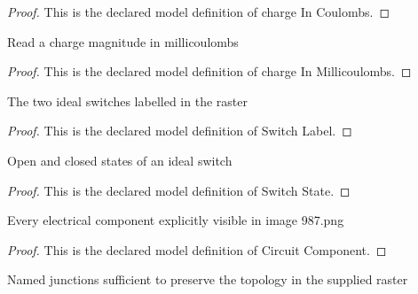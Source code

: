 \begin{proof}
  This is the declared model definition of charge In Coulombs.
\end{proof}
\begin{definition}
  \label{def:physics:phyx-mini-0987:phyxminiproblems-problemphyxmini0987-chargeinmillicoulombs}
  Read a charge magnitude in millicoulombs
\end{definition}
\begin{proof}
  This is the declared model definition of charge In Millicoulombs.
\end{proof}
\begin{definition}
  \label{def:physics:phyx-mini-0987:phyxminiproblems-problemphyxmini0987-switchlabel}
  The two ideal switches labelled in the raster
\end{definition}
\begin{proof}
  This is the declared model definition of Switch Label.
\end{proof}
\begin{definition}
  \label{def:physics:phyx-mini-0987:phyxminiproblems-problemphyxmini0987-switchstate}
  Open and closed states of an ideal switch
\end{definition}
\begin{proof}
  This is the declared model definition of Switch State.
\end{proof}
\begin{definition}
  \label{def:physics:phyx-mini-0987:phyxminiproblems-problemphyxmini0987-circuitcomponent}
  Every electrical component explicitly visible in image 987.png
\end{definition}
\begin{proof}
  This is the declared model definition of Circuit Component.
\end{proof}
\begin{definition}
  \label{def:physics:phyx-mini-0987:phyxminiproblems-problemphyxmini0987-circuitnode}
  Named junctions sufficient to preserve the topology in the supplied raster
\end{definition}
